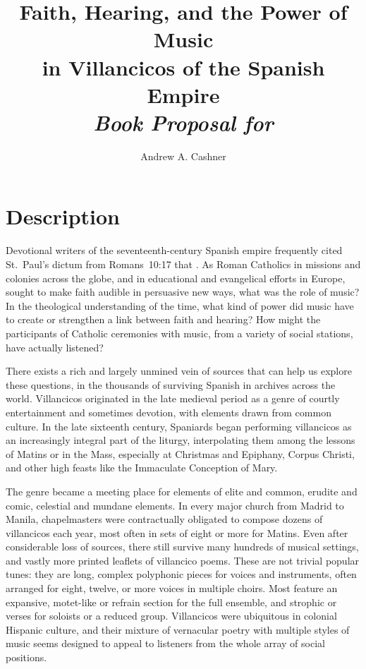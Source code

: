 \documentclass{vcbook-proposal}
\title    {Faith, Hearing, and the Power of Music\\
           in Villancicos of the Spanish Empire\\
           \emph{Book Proposal for \publisher}}
\author   {Andrew A. Cashner}
\begin{document}
\maketitle

\tableofcontents
\clearpage

\section{Description}

Devotional writers of the seventeenth-century Spanish empire frequently cited 
St.~Paul's dictum from Romans~10:17 that .
As Roman Catholics in missions and colonies across the globe, and in 
educational and evangelical efforts in Europe, sought to make faith audible in 
persuasive new ways, what was the role of music?
In the theological understanding of the time, what kind of power did music have 
to create or strengthen a link between faith and hearing?
How might the participants of Catholic ceremonies with music, from a variety of 
social stations, have actually listened?

There exists a rich and largely unmined vein of sources that can help us 
explore these questions, in the thousands of surviving Spanish 
 in archives across the world.
Villancicos originated in the late medieval period as a genre of courtly 
entertainment and sometimes devotion, with elements drawn from common culture.
In the late sixteenth century, Spaniards began performing villancicos as an 
increasingly integral part of the liturgy, interpolating them among the lessons 
of Matins or in the Mass, especially at Christmas and Epiphany, Corpus Christi, 
and other high feasts like the Immaculate Conception of Mary.

The genre became a meeting place for elements of elite and common, erudite and 
comic, celestial and mundane elements.
In every major church from Madrid to Manila, chapelmasters were contractually 
obligated to compose dozens of villancicos each year, most often in sets of 
eight or more for Matins.
Even after considerable loss of sources, there still survive many hundreds of 
musical settings, and vastly more printed leaflets of villancico poems. 
These are not trivial popular tunes: they are long, complex polyphonic pieces 
for voices and instruments, often arranged for eight, twelve, or more voices in 
multiple choirs.
Most feature an expansive, motet-like  or refrain section for 
the full ensemble, and strophic  or verses for soloists or a 
reduced group.
Villancicos were ubiquitous in colonial Hispanic culture, and their mixture of 
vernacular poetry with multiple styles of music seems designed to appeal to 
listeners from the whole array of social positions.
\end{document}
